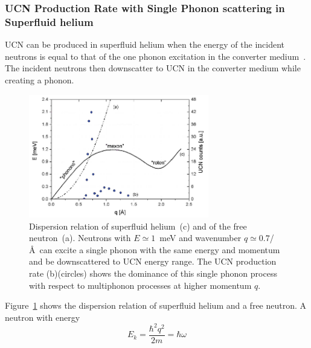 \subsubsection{UCN Production Rate with Single Phonon scattering in
  Superfluid
  helium\label{sec:UCN_production}}
UCN can be produced in superfluid helium when the energy of the
incident neutrons is equal to that of the one phonon excitation in the
converter medium~\cite{Korobkina2002,Schmidt2009,Golub77}. The
incident neutrons then downscatter to UCN in the converter medium
while creating a phonon.
\begin{figure}[h!]
\begin{center}
   \includegraphics[width=0.7\textwidth]{FIG1_2.PNG}
   \caption[Free neutron and superfluid helium dispersion
   relation]{\cite{PSI_news} Dispersion relation of superfluid
     helium~(c) and of the free neutron~(a). Neutrons with
     $E\simeq 1$~meV and wavenumber $q \simeq 0.7$/\AA~can excite a
     single phonon with the same energy and momentum and be
     downscattered to UCN energy range. The UCN production rate
     (b)(circles) shows the dominance of this single phonon process
     with respect to multiphonon processes at higher momentum $q$.
    }
    \label{fig:FIG1}
    \end{center}
\end{figure} 
Figure~\ref{fig:FIG1} shows the dispersion relation of superfluid
helium and a free neutron. A neutron with energy
\begin{equation}
  \label{eqn:neutron_energy}
  E_k = \frac{\hbar^2 q^2}{2 m} = \hbar \omega
\end{equation}
